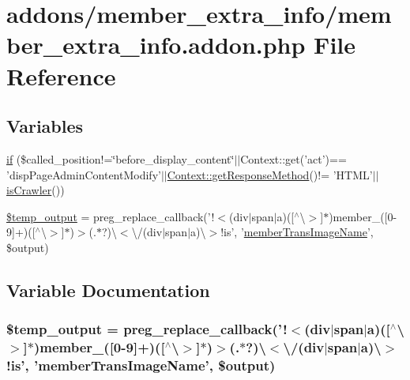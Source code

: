 \hypertarget{member__extra__info_8addon_8php}{\section{addons/member\+\_\+extra\+\_\+info/member\+\_\+extra\+\_\+info.addon.\+php File Reference}
\label{member__extra__info_8addon_8php}
}
\subsection*{Variables}
\begin{DoxyCompactItemize}
\item 
\hyperlink{member__extra__info_8addon_8php_a29031816e50a8f742422e671b2bef9b2}{if} (\$called\+\_\+position!=\char`\"{}before\+\_\+display\+\_\+content\char`\"{}$\vert$$\vert$Context\+::get('act')== 'disp\+Page\+Admin\+Content\+Modify'$\vert$$\vert$\hyperlink{classContext_a1d02a15209360034cd719d8b08cb5061}{Context\+::get\+Response\+Method}()!= 'H\+T\+M\+L'$\vert$$\vert$\hyperlink{func_8inc_8php_a490ffbd4821da1995c76c381553d5b3d}{is\+Crawler}())
\item 
\hyperlink{member__extra__info_8addon_8php_a5866ef6f77cbeaf87d8208cf805bbc3d}{\$temp\+\_\+output} = preg\+\_\+replace\+\_\+callback('!$<$(div$\vert$span$\vert$a)(\mbox{[}$^\wedge$\textbackslash{}$>$\mbox{]}$\ast$)member\+\_\+(\mbox{[}0-\/9\mbox{]}+)(\mbox{[}$^\wedge$\textbackslash{}$>$\mbox{]}$\ast$)$>$(.$\ast$?)\textbackslash{}$<$\textbackslash{}/(div$\vert$span$\vert$a)\textbackslash{}$>$!is', '\hyperlink{member__extra__info_8lib_8php_a21882e797e0da66aed32f1cf3053eaf2}{member\+Trans\+Image\+Name}', \$output)
\end{DoxyCompactItemize}


\subsection{Variable Documentation}
\hypertarget{member__extra__info_8addon_8php_a5866ef6f77cbeaf87d8208cf805bbc3d}{
\subsubsection[{\$temp\+\_\+output}]{\setlength{\rightskip}{0pt plus 5cm}\$temp\+\_\+output = preg\+\_\+replace\+\_\+callback('!$<$(div$\vert$span$\vert$a)(\mbox{[}$^\wedge$\textbackslash{}$>$\mbox{]}$\ast$)member\+\_\+(\mbox{[}0-\/9\mbox{]}+)(\mbox{[}$^\wedge$\textbackslash{}$>$\mbox{]}$\ast$)$>$(.$\ast$?)\textbackslash{}$<$\textbackslash{}/(div$\vert$span$\vert$a)\textbackslash{}$>$!is', '{\bf member\+Trans\+Image\+Name}', \$output)}}\label{member__extra__info_8addon_8php_a5866ef6f77cbeaf87d8208cf805bbc3d}


